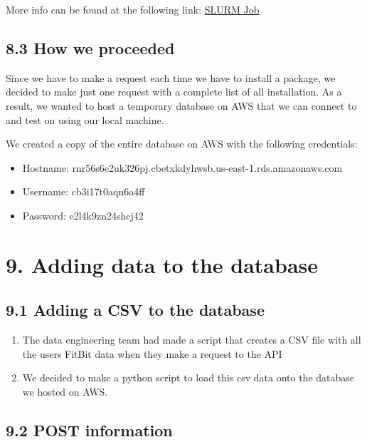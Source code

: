 \documentclass[]{book}
\providecommand{\tightlist}{%
  \setlength{\itemsep}{0pt}\setlength{\parskip}{0pt}}
\begin{document}
More info can be found at the following link:
\href{https://www.rcac.purdue.edu/knowledge/weber/run/slurm}{SLURM Job}

\subsection{8.3 How we proceeded}\label{how-we-proceeded-1}

Since we have to make a request each time we have to install a package,
we decided to make just one request with a complete list of all
installation. As a result, we wanted to host a temporary database on AWS
that we can connect to and test on using our local machine.

We created a copy of the entire database on AWS with the following
credentials:

\begin{itemize}
\tightlist
\item
  Hostname: rnr56s6e2uk326pj.cbetxkdyhwsb.us-east-1.rds.amazonaws.com
\item
  Username: cb3i17t0aqn6a4ff
\item
  Password: e2l4k9zn24shcj42
\end{itemize}

\section{9. Adding data to the
database}\label{adding-data-to-the-database-1}

\subsection{9.1 Adding a CSV to the
database}\label{adding-a-csv-to-the-database-1}

\begin{enumerate}
\def\labelenumi{\arabic{enumi}.}
\tightlist
\item
  The data engineering team had made a script that creates a CSV file
  with all the users FitBit data when they make a request to the API
\item
  We decided to make a python script to load this csv data onto the
  database we hosted on AWS.
\end{enumerate}

\subsection{9.2 POST information}\label{post-information-1}
\end{document}

